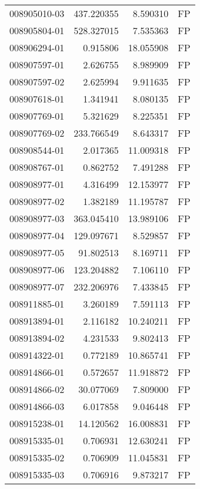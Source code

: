 \begin{tabular}{lrrl}
008905010-03 &  437.220355 &       8.590310 &   FP \\
008905804-01 &  528.327015 &       7.535363 &   FP \\
008906294-01 &    0.915806 &      18.055908 &   FP \\
008907597-01 &    2.626755 &       8.989909 &   FP \\
008907597-02 &    2.625994 &       9.911635 &   FP \\
008907618-01 &    1.341941 &       8.080135 &   FP \\
008907769-01 &    5.321629 &       8.225351 &   FP \\
008907769-02 &  233.766549 &       8.643317 &   FP \\
008908544-01 &    2.017365 &      11.009318 &   FP \\
008908767-01 &    0.862752 &       7.491288 &   FP \\
008908977-01 &    4.316499 &      12.153977 &   FP \\
008908977-02 &    1.382189 &      11.195787 &   FP \\
008908977-03 &  363.045410 &      13.989106 &   FP \\
008908977-04 &  129.097671 &       8.529857 &   FP \\
008908977-05 &   91.802513 &       8.169711 &   FP \\
008908977-06 &  123.204882 &       7.106110 &   FP \\
008908977-07 &  232.206976 &       7.433845 &   FP \\
008911885-01 &    3.260189 &       7.591113 &   FP \\
008913894-01 &    2.116182 &      10.240211 &   FP \\
008913894-02 &    4.231533 &       9.802413 &   FP \\
008914322-01 &    0.772189 &      10.865741 &   FP \\
008914866-01 &    0.572657 &      11.918872 &   FP \\
008914866-02 &   30.077069 &       7.809000 &   FP \\
008914866-03 &    6.017858 &       9.046448 &   FP \\
008915238-01 &   14.120562 &      16.008831 &   FP \\
008915335-01 &    0.706931 &      12.630241 &   FP \\
008915335-02 &    0.706909 &      11.045831 &   FP \\
008915335-03 &    0.706916 &       9.873217 &   FP \\

\end{tabular}
